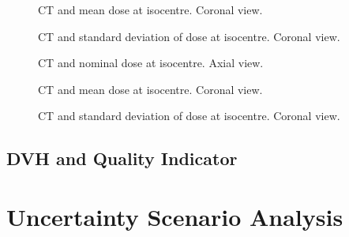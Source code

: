 \documentclass[a4paper]{scrartcl}
\begin{document}
\begin{figure}[!b]
  \centering
  
  \caption{CT and mean dose at isocentre. Coronal view.}
\end{figure}

\begin{figure}[!b]
  \centering
  
  \caption{CT and standard deviation of dose at isocentre. Coronal view.}
\end{figure}

\begin{figure}[!b]
  \centering
  
  \caption{CT and nominal dose at isocentre. Axial view.}
\end{figure}

\begin{figure}[!b]
  \centering
  
  \caption{CT and mean dose at isocentre. Coronal view.}
\end{figure}

\begin{figure}[!b]
  \centering
  
  \caption{CT and standard deviation of dose at isocentre. Coronal view.}
\end{figure}

\FloatBarrier

\newpage
\subsection{DVH and Quality Indicator}
\begin{center}

\end{center}


\FloatBarrier
\newpage
\section{Uncertainty Scenario Analysis}
\label{sec:usa}


\end{document}
